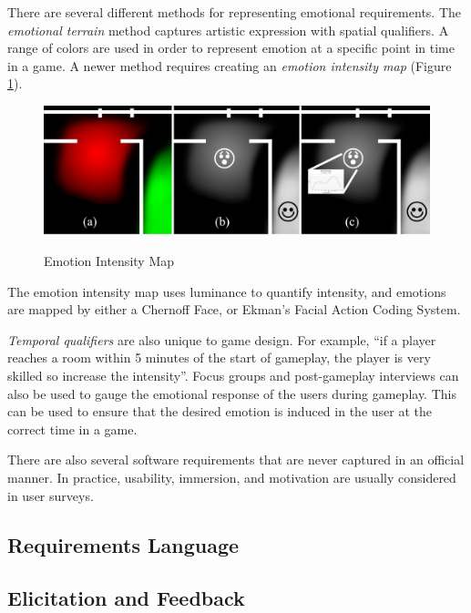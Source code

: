 There are several different methods for representing emotional requirements. The \emph{emotional terrain} method captures artistic expression with spatial qualifiers. A range of colors are used in order to represent emotion at a specific point in time in a game. A newer method requires creating an \emph{emotion intensity map} (Figure \ref{emotion_intensity_map}).

\begin{figure}[!ht]
	\includegraphics[scale=0.3]{Images/emotion_intensity_map}
	\label{emotion_intensity_map}
	\caption{Emotion Intensity Map \cite{callele2006emotional}}
\end{figure}

The emotion intensity map uses luminance to quantify intensity, and emotions are mapped by either a Chernoff Face\cite{flury1981graphical}, or Ekman's Facial Action Coding System\cite{ekman2002facial}.

\emph{Temporal qualifiers} are also unique to game design. For example, ``if a player reaches a room within 5 minutes of the start of gameplay, the player is very skilled so increase the intensity''\cite{callele2006emotional}. Focus groups and post-gameplay interviews can also be used to gauge the emotional response of the users during gameplay. This can be used to ensure that the desired emotion is induced in the user at the correct time in a game.

There are also several software requirements that are never captured in an official manner\cite{bentley2002putting}. In practice, usability, immersion, and motivation are usually considered in user surveys.

\subsection{Requirements Language}

\subsection{Elicitation and Feedback}

